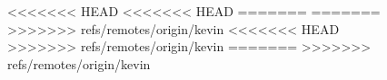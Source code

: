 \documentclass{nature}
\begin{document}
{\begin{figure}[tb]
<<<<<<< HEAD
<<<<<<< HEAD
=======
=======
>>>>>>> refs/remotes/origin/kevin
<<<<<<< HEAD
>>>>>>> refs/remotes/origin/kevin
=======
>>>>>>> refs/remotes/origin/kevin


\end{figure}}
\end{document}

